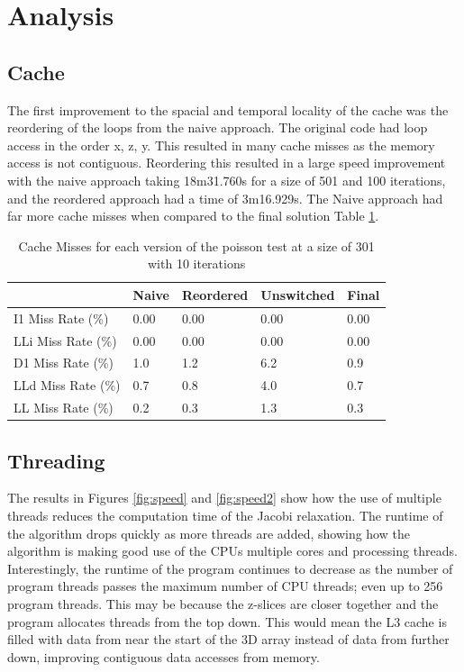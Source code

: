 \documentclass[12pt]{article}
\begin{document}
\section{Analysis}

\subsection{Cache}
The first improvement to the spacial and temporal locality of the cache was the reordering of the loops from the naive approach.
The original code had loop access in the order x, z, y. This resulted in many cache misses as the memory access is not contiguous.
Reordering this resulted in a large speed improvement with the naive approach taking 18m31.760s for a size of 501 and 100 iterations, and the reordered approach
had a time of 3m16.929s. The Naive approach had far more cache misses when compared to the final solution Table \ref{table:cache}.

\begin{table}[H]
    \centering
    \caption{Cache Misses for each version of the poisson test at a size of 301 with 10 iterations}
    \label{table:cache}
    \begin{tabular}{ | m{4cm} | m{2cm} | m{2cm} | m{2cm} | m{2cm} | }
        \hline
        & Naive & Reordered & Unswitched & Final\\
        \hline
        I1 Miss Rate (\%) & 0.00 & 0.00 & 0.00 & 0.00\\
        \hline
        LLi Miss Rate (\%) & 0.00 & 0.00 & 0.00 & 0.00\\
        \hline
        D1 Miss Rate (\%) & 1.0 & 1.2 & 6.2 & 0.9\\
        \hline
        LLd Miss Rate (\%) & 0.7 & 0.8 & 4.0 & 0.7\\
        \hline
        LL Miss Rate (\%) & 0.2 & 0.3 & 1.3 & 0.3\\
        \hline
        
    \end{tabular}
\end{table}

\subsection{Threading}
The results in Figures \ref{fig:speed} and \ref{fig:speed2} show how the use of multiple threads reduces the computation time of the Jacobi relaxation.
The runtime of the algorithm drops quickly as more threads are added, showing how the algorithm is making good use
of the CPUs multiple cores and processing threads. Interestingly, the runtime of the program continues to decrease
as the number of program threads passes the maximum number of CPU threads; even up to 256 program threads. This may
be because the z-slices are closer together and the program allocates threads from the top down. This would mean
the L3 cache is filled with data from near the start of the 3D array instead of data from further down,
improving contiguous data accesses from memory.
\end{document}
